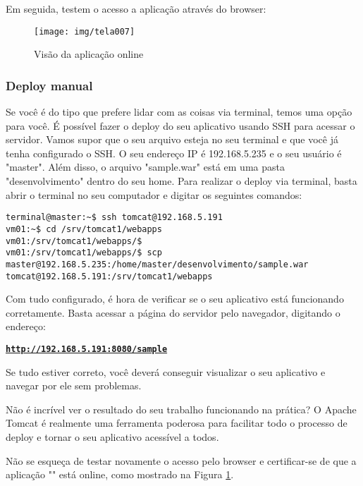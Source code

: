 \newpage
Em seguida, testem o acesso a aplicação através do browser:
\begin{figure}[H]
	\hypertarget{figura-smaple.war}{}
	\centering
	\caption[sample.war]{Visão da aplicação online}
	\texttt{[image: img/tela007]}
	\label{fig:showapp}
\end{figure}
\subsubsection{Deploy manual}

Se você é do tipo que prefere lidar com as coisas via terminal, temos uma opção para você. É possível fazer o deploy do seu aplicativo usando SSH para acessar o servidor. Vamos supor que o seu arquivo esteja no seu terminal e que você já tenha configurado o SSH. O seu endereço IP é 192.168.5.235 e o seu usuário é "master". Além disso, o arquivo "sample.war" está em uma pasta "desenvolvimento" dentro do seu home. Para realizar o deploy via terminal, basta abrir o terminal no seu computador e digitar os seguintes comandos:


\begin{lstlisting}[breaklines=true,basicstyle=\ttfamily, 
label=acessosshVm0100 ,
breaklines=true,caption=\firacoderetina Acessar o servidor via ssh e efetuar o deploy via terminal,
postbreak=\mbox{\textcolor{red}{$\hookrightarrow$}\space},
showstringspaces=false]
terminal@master:~$ ssh tomcat@192.168.5.191
vm01:~$ cd /srv/tomcat1/webapps
vm01:/srv/tomcat1/webapps/$
vm01:/srv/tomcat1/webapps/$ scp master@192.168.5.235:/home/master/desenvolvimento/sample.war tomcat@192.168.5.191:/srv/tomcat1/webapps
\end{lstlisting}

Com tudo configurado, é hora de verificar se o seu aplicativo está funcionando corretamente. Basta acessar a página do servidor pelo navegador, digitando o endereço: 
\begin{center}
	\hyperlink{figura-smaple.war}{{\texttt{\textbf{http://192.168.5.191:8080/sample}}}}
\end{center}
Se tudo estiver correto, você deverá conseguir visualizar o seu aplicativo e navegar por ele sem problemas.

Não é incrível ver o resultado do seu trabalho funcionando na prática? O Apache Tomcat é realmente uma ferramenta poderosa para facilitar todo o processo de deploy e tornar o seu aplicativo acessível a todos.

Não se esqueça de testar novamente o acesso pelo browser e certificar-se de que a aplicação "" está online, como mostrado na Figura \ref{fig:showapp}.

